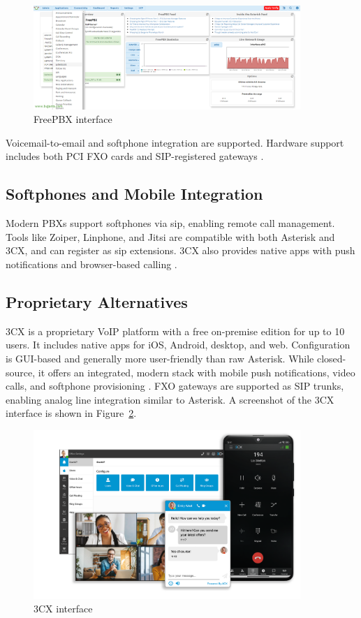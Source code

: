 \begin{figure}[H]
  \centering
  \includegraphics[width=0.9\textwidth]{imaxes/freepbx-ui.png}
  \caption{FreePBX interface}
  \label{fig:freepbx-ui}
\end{figure}

Voicemail-to-email and softphone integration are supported. Hardware support includes both PCI FXO cards and SIP-registered gateways \cite{AsteriskFeatures}.
\subsection*{Softphones and Mobile Integration}

Modern PBXs support softphones via \gls{sip}, enabling remote call management. Tools like Zoiper, Linphone, and Jitsi are compatible with both Asterisk and 3CX, and can register as \gls{sip} extensions. 3CX also provides native apps with push notifications and browser-based calling \cite{Zoiper_Compatibility}.

\subsection*{Proprietary Alternatives}

3CX is a proprietary VoIP platform with a free on-premise edition for up to 10 users. It includes native apps for iOS, Android, desktop, and web. Configuration is GUI-based and generally more user-friendly than raw Asterisk. While closed-source, it offers an integrated, modern stack with mobile push notifications, video calls, and softphone provisioning \cite{3CXPricing2024,3CXMarketing2024}. FXO gateways are supported as SIP trunks, enabling analog line integration similar to Asterisk. A screenshot of the 3CX interface is shown in Figure~\ref{fig:3cx-ui}.

\begin{figure}[H]
  \centering
  \includegraphics[width=0.9\textwidth]{imaxes/3cx-ui.png}
  \caption{3CX interface}
  \label{fig:3cx-ui}
\end{figure}

